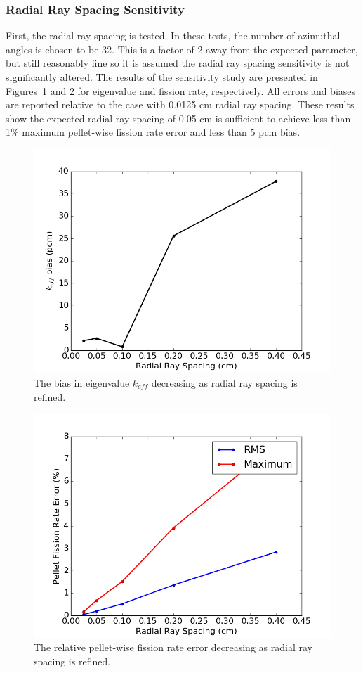 \subsubsection{Radial Ray Spacing Sensitivity}

First, the radial ray spacing is tested. In these tests, the number of azimuthal angles is chosen to be 32. This is a factor of 2 away from the expected parameter, but still reasonably fine so it is assumed the radial ray spacing sensitivity is not significantly altered. The results of the sensitivity study are presented in Figures~\ref{fig:radial-rs-pcm} and \ref{fig:radial-rs-fr} for eigenvalue and fission rate, respectively. All errors and biases are reported relative to the case with 0.0125 cm radial ray spacing. These results show the expected radial ray spacing of 0.05 cm is sufficient to achieve less than 1\% maximum pellet-wise fission rate error and less than 5 pcm bias.

\begin{figure}[h!]
	\centering
	\includegraphics[width=0.7\linewidth]{figures/results/sensitivity/rad_spacing_pcm.png}
	\caption[]{The bias in eigenvalue $k_{\textit{eff}}$ decreasing as radial ray spacing is refined.}
	\label{fig:radial-rs-pcm}
\end{figure}
\begin{figure}[h!]
	\centering
	\includegraphics[width=0.7\linewidth]{figures/results/sensitivity/rad_spacing_fr.png}
	\caption[]{The relative pellet-wise fission rate error decreasing as radial ray spacing is refined.}
	\label{fig:radial-rs-fr}
\end{figure}

